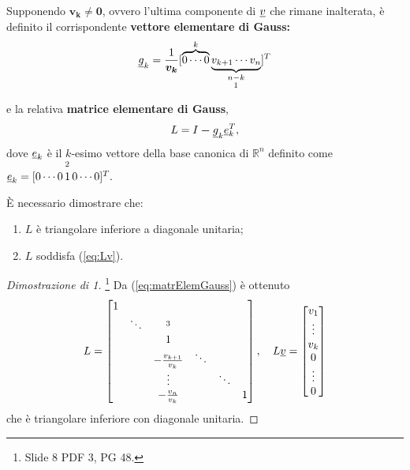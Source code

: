 Supponendo $\boldsymbol{v_k\neq 0}$, ovvero l'ultima componente di $\uline v$ che rimane inalterata, è definito il corrispondente \textbf{vettore elementare di Gauss:}
\begin{equation}\label{eq:vettElemGauss}
    \uline g_k=\frac{1}{\boldsymbol{v_k}}[\overbrace{0\cdots 0}^k \underbrace{v_{k+1}\cdots v_n}_{\underset{\footnotemark}{n-k}}]^T
\end{equation}
e la relativa \textbf{matrice elementare di Gauss},
\begin{equation}\label{eq:matrElemGauss}
    L=I\boldsymbol - \uline g_k \uline e_k^T,
\end{equation}
dove $\uline e_k$ è il $k$-esimo vettore della base canonica di $\mathbb R^n$ definito come $\uline e_k=[0\cdots 0\,\overset{\footnotemark}{1}\, 0 \cdots 0]^T.$ 

È necessario dimostrare che:
\begin{enumerate}
    \item $L$ è triangolare inferiore a diagonale unitaria;
    \item $L$ soddisfa (\ref{eq:Lv}).
\end{enumerate}

\begin{proof}[Dimostrazione di 1]\footnote{Slide 8 PDF 3, PG 48.}
    Da (\ref{eq:matrElemGauss}) è ottenuto
    \begin{equation*}
        L = \begin{bmatrix}
            1 \\
            & \ddots & \footnotemark \\
            & & 1\\
            & & -\frac{v_{k+1}}{v_k}&\ddots\\
            & & \vdots & &\ddots\\
            & & -\frac{v_n}{v_k} & & & 1\\
        \end{bmatrix},\quad L\uline v=\begin{bmatrix}
            v_1\\
            \vdots\\
            v_k\\
            0\\
            \vdots\\
            0
        \end{bmatrix}
    \end{equation*}
    che è triangolare inferiore con diagonale unitaria.
\end{proof}


